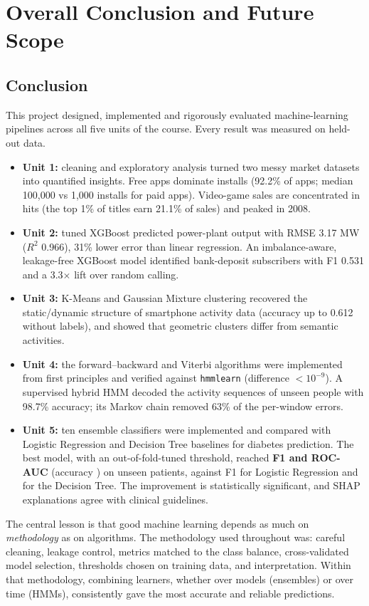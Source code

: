 \chapter{Overall Conclusion and Future Scope}

\section{Conclusion}
This project designed, implemented and rigorously evaluated machine-learning pipelines across all five units of the
course. Every result was measured on held-out data.
\begin{itemize}
\item \textbf{Unit 1:} cleaning and exploratory analysis turned two messy market datasets into quantified insights.
Free apps dominate installs (92.2\% of apps; median 100,000 vs 1,000 installs for paid apps). Video-game sales are
concentrated in hits (the top 1\% of titles earn 21.1\% of sales) and peaked in 2008.
\item \textbf{Unit 2:} tuned XGBoost predicted power-plant output with RMSE 3.17 MW ($R^2$ 0.966), 31\% lower error than
linear regression. An imbalance-aware, leakage-free XGBoost model identified bank-deposit subscribers with F1 0.531 and
a 3.3$\times$ lift over random calling.
\item \textbf{Unit 3:} K-Means and Gaussian Mixture clustering recovered the static/dynamic structure of smartphone
activity data (accuracy up to 0.612 without labels), and showed that geometric clusters differ from semantic activities.
\item \textbf{Unit 4:} the forward–backward and Viterbi algorithms were implemented from first principles and verified
against \texttt{hmmlearn} (difference $<10^{-9}$). A supervised hybrid HMM decoded the activity sequences of unseen
people with 98.7\% accuracy; its Markov chain removed 63\% of the per-window errors.
\item \textbf{Unit 5:} ten ensemble classifiers were implemented and compared with Logistic Regression and Decision Tree
baselines for diabetes prediction. The best model, \dbBestName{} with an out-of-fold-tuned threshold, reached
\textbf{F1 \dbBestFone{} and ROC-AUC \dbBestAuc{}} (accuracy \dbBestAccPct) on \dbTest{} unseen patients, against F1
\dbLrFone{} for Logistic Regression and \dbDtFone{} for the Decision Tree. The improvement is statistically significant,
and SHAP explanations agree with clinical guidelines.
\end{itemize}
The central lesson is that good machine learning depends as much on \emph{methodology} as on algorithms. The methodology
used throughout was: careful cleaning, leakage control, metrics matched to the class balance, cross-validated model
selection, thresholds chosen on training data, and interpretation. Within that methodology, combining learners, whether
over models (ensembles) or over time (HMMs), consistently gave the most accurate and reliable predictions.


